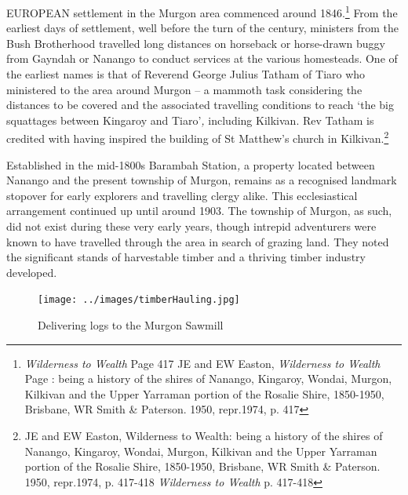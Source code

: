 \lettrine[lines=3]{E}{UROPEAN}
 settlement in the Murgon area commenced around 1846.\footnote{\emph{Wilderness to Wealth} Page 417 JE and EW Easton, \emph{Wilderness to Wealth} Page : being a history of the shires of Nanango, Kingaroy, Wondai, Murgon, Kilkivan and the Upper Yarraman portion of the Rosalie Shire, 1850-1950, Brisbane, WR Smith \& Paterson. 1950, repr.1974, p. 417} From the earliest days of settlement, well before the turn of the century, ministers from the Bush Brotherhood travelled long distances on horseback or horse-drawn buggy from Gayndah or Nanango to conduct services at the various homesteads. One of the earliest names is that of Reverend George Julius Tatham of Tiaro who ministered to the area around Murgon -- a mammoth task considering the distances to be covered and the associated travelling conditions to reach `the big squattages between Kingaroy and Tiaro'\emph{,} including Kilkivan. Rev Tatham is credited with having inspired the building of St Matthew's church in Kilkivan.\footnote{JE and EW Easton, Wilderness to Wealth: being a history of the shires of Nanango, Kingaroy, Wondai, Murgon, Kilkivan and the Upper Yarraman portion of the Rosalie Shire, 1850-1950, Brisbane, WR Smith \& Paterson. 1950, repr.1974, p. 417-418 \emph{Wilderness to Wealth} p. 417-418}

Established in the mid-1800s Barambah Station\emph{,} a property located between Nanango and the present township of Murgon, remains as a recognised landmark stopover for early explorers and travelling clergy alike. This ecclesiastical arrangement continued up until around 1903. The township of Murgon, as such, did not exist during these very early years, though intrepid adventurers were known to have travelled through the area in search of grazing land. They noted the significant stands of harvestable timber and a thriving timber industry developed.









\begin{figure}
\begin{center}
\texttt{[image: ../images/timberHauling.jpg]}
\caption{Delivering logs to the Murgon Sawmill}
\end{center}
\end{figure}




